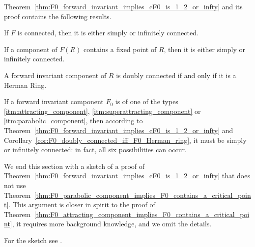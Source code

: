 Theorem~\ref{thm:F0_forward_invariant_implies_cF0_is_1_2_or_infty} and its proof
contains the following results.

\begin{corollary}
    If $F$ is connected, then it is either simply or infinitely connected.
\end{corollary}

\begin{corollary}
    If a component of $F(R)$ contains a fixed point of $R$, then it is either
    simply or infinitely connected.
\end{corollary}

\begin{corollary}
    \label{cor:F0_doubly_connected_iff_F0_Herman_ring}
    A forward invariant component of $R$ is doubly connected if and only if it
    is a Herman Ring.
\end{corollary}

\begin{remark}
    If a forward invariant component $F_0$ is of one of the types
    \ref{itm:attracting_component}, \ref{itm:superattracting_component} or
    \ref{itm:parabolic_component}, then according to
    Theorem~\ref{thm:F0_forward_invariant_implies_cF0_is_1_2_or_infty} and
    Corollary~\ref{cor:F0_doubly_connected_iff_F0_Herman_ring}, it must be
    simply or infinitely connected: in fact, all six possibilities can occur.
\end{remark}

We end this section with a sketch of a proof of
Theorem~\ref{thm:F0_forward_invariant_implies_cF0_is_1_2_or_infty} that does not
use
Theorem~\ref{thm:F0_parabolic_component_implies_F0_contains_a_critical_point}.
This argument is closer in spirit to the proof of
Theorem~\ref{thm:F0_attracting_component_implies_F0_contains_a_critical_point},
it requires more background knowledge, and we omit the details.

For the sketch see \cite[174--175]{Beardon1991}.